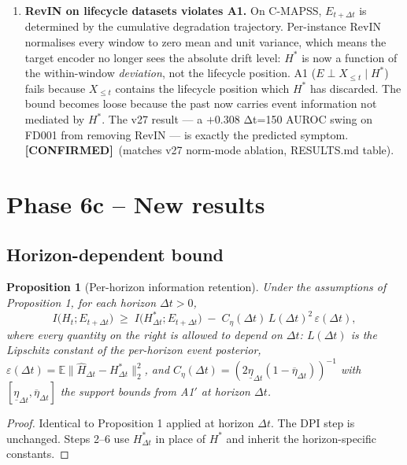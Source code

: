 \documentclass[11pt]{article}
\newtheorem{proposition}{Proposition}
\newcommand{\E}{\mathbb{E}}
\newcommand{\CONF}{{\color{black!60!green}\textbf{[CONFIRMED]}}}
\begin{document}
\begin{enumerate}[leftmargin=1.5em,label=(P\arabic*)]
\item \textbf{RevIN on lifecycle datasets violates A1.}
On C-MAPSS, $E_{t+\Delta t}$ is determined by the cumulative degradation
trajectory. Per-instance RevIN normalises every window to zero mean and
unit variance, which means the target encoder no longer sees the
absolute drift level: $H^*$ is now a function of the within-window
\emph{deviation}, not the lifecycle position. A1 ($E\perp X_{\le t}\mid
H^*$) fails because $X_{\le t}$ contains the lifecycle position which
$H^*$ has discarded. The bound becomes loose because the past now
carries event information not mediated by $H^*$. The v27 result --- a
$+0.308$ Δt=150 AUROC swing on FD001 from removing RevIN --- is exactly
the predicted symptom. \CONF\ (matches v27 norm-mode ablation,
RESULTS.md table).
\end{enumerate}

\section{Phase 6c -- New results}
\label{sec:phase6c}

\subsection{Horizon-dependent bound}

\begin{proposition}[Per-horizon information retention]
\label{prop:per-horizon}
Under the assumptions of Proposition 1, for each horizon $\Delta t>0$,
\begin{equation}\label{eq:per-horizon}
I\bigl(H_t;E_{t+\Delta t}\bigr)
\;\ge\;
I\bigl(H^*_{\Delta t};E_{t+\Delta t}\bigr)
\;-\;C_\eta(\Delta t)\,L(\Delta t)^2\,\varepsilon(\Delta t),
\end{equation}
where every quantity on the right is allowed to depend on $\Delta t$:
$L(\Delta t)$ is the Lipschitz constant of the per-horizon event posterior,
$\varepsilon(\Delta t)=\E\|\hat H_{\Delta t}-H^*_{\Delta t}\|_2^2$, and
$C_\eta(\Delta t)=(2\underline\eta_{\Delta t}(1-\overline\eta_{\Delta t}))^{-1}$
with $[\underline\eta_{\Delta t},\overline\eta_{\Delta t}]$ the support
bounds from A1$'$ at horizon $\Delta t$.
\end{proposition}

\begin{proof}
Identical to Proposition 1 applied at horizon $\Delta t$. The DPI step is
unchanged. Steps 2--6 use $H^*_{\Delta t}$ in place of $H^*$ and inherit
the horizon-specific constants.
\end{proof}
\end{document}

